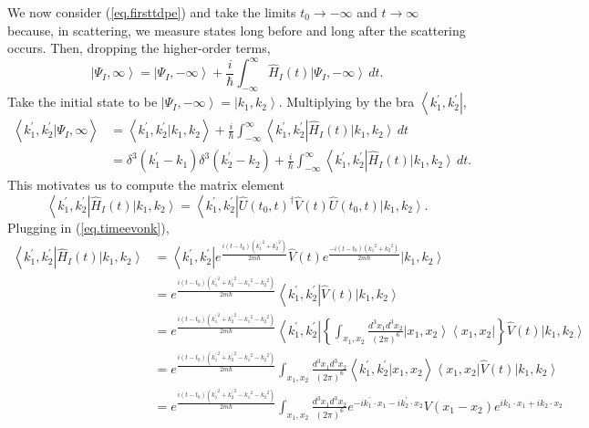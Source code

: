 \documentclass[11pt]{article}
\newcommand{\bra}[1]{\left\langle#1\right|}
\newcommand{\ket}[1]{\left|#1\right\rangle}
\newcommand{\braket}[2]{\left\langle#1|#2\right\rangle}
\newcommand{\op}[1]{\hat{#1}}
\theoremstyle{theorem}
\theoremstyle{remark}
\theoremstyle{step}
\theoremstyle{gap}
\begin{document}
We now consider (\ref{eq.firsttdpe}) and take the limits \(t_0 \to -\infty\) and \(t \to \infty\) because, in scattering, we measure states long before and long after the scattering occurs. Then, dropping the higher-order terms,
\[
\ket{\Psi_I, \infty} = \ket{\Psi_I, -\infty} + \frac{i}{\hbar} \int_{-\infty}^\infty \op{H}_I(t)\ket{\Psi_I, -\infty} \,dt.
\]
Take the initial state to be \(\ket{\Psi_I, -\infty} = \ket{k_1, k_2}\). Multiplying by the bra \(\bra{k_1^\prime, k_2^\prime}\),
\begin{align}
\braket{k_1^\prime, k_2^\prime}{\Psi_I, \infty} &= \braket{k_1^\prime, k_2^\prime}{k_1, k_2} + \frac{i}{\hbar} \int_{-\infty}^\infty \bra{k_1^\prime, k_2^\prime} \op{H}_I(t)\ket{k_1, k_2} \,dt \nonumber\\
&= \delta^3(k_1^\prime - k_1)\delta^3(k_2^\prime - k_2) + \frac{i}{\hbar} \int_{-\infty}^\infty \bra{k_1^\prime, k_2^\prime} \op{H}_I(t)\ket{k_1, k_2} \,dt. \label{eq.intermed}
\end{align}
This motivates us to compute the matrix element
\[
\bra{k_1^\prime, k_2^\prime} \op{H}_I(t)\ket{k_1, k_2} = \bra{k_1^\prime, k_2^\prime} \op{U}(t_0, t)^\dagger \op{V}(t) \op{U}(t_0, t) \ket{k_1, k_2}.
\]
Plugging in (\ref{eq.timeevonk}),
\begin{align*}
\bra{k_1^\prime, k_2^\prime} \op{H}_I(t)\ket{k_1, k_2} &= \bra{k_1^\prime, k_2^\prime} e^{\frac{i\left(t-t_0\right)\left({k_1^\prime}^2 + {k_2^\prime}^2\right)}{2m\hbar}} \op{V}(t) e^{\frac{-i\left(t-t_0\right)\left({k_1}^2 + {k_2}^2\right)}{2m\hbar}} \ket{k_1, k_2} \\
&= e^{\frac{i\left(t-t_0\right)\left({k_1^\prime}^2 + {k_2^\prime}^2 - {k_1}^2 - {k_2}^2\right)}{2m\hbar}} \bra{k_1^\prime, k_2^\prime} \op{V}(t) \ket{k_1, k_2} \\
&= e^{\frac{i\left(t-t_0\right)\left({k_1^\prime}^2 + {k_2^\prime}^2 - {k_1}^2 - {k_2}^2\right)}{2m\hbar}} \bra{k_1^\prime, k_2^\prime} \left\{\int_{x_1, x_2} \frac{d^3 x_1 d^3 x_2}{(2\pi)^6}\ket{x_1, x_2}\bra{x_1, x_2}\right\}\op{V}(t) \ket{k_1, k_2} \\
&= e^{\frac{i\left(t-t_0\right)\left({k_1^\prime}^2 + {k_2^\prime}^2 - {k_1}^2 - {k_2}^2\right)}{2m\hbar}}  \int_{x_1, x_2} \frac{d^3 x_1 d^3 x_2}{(2\pi)^6}\braket{k_1^\prime, k_2^\prime}{x_1, x_2}\bra{x_1, x_2}\op{V}(t) \ket{k_1, k_2} \\
&= e^{\frac{i\left(t-t_0\right)\left({k_1^\prime}^2 + {k_2^\prime}^2 - {k_1}^2 - {k_2}^2\right)}{2m\hbar}}  \int_{x_1, x_2} \frac{d^3 x_1 d^3 x_2}{(2\pi)^6}e^{-ik_1^\prime\cdot x_1 - ik_2^\prime\cdot x_2}V(x_1 - x_2) e^{ik_1\cdot x_1 + ik_2\cdot x_2} 
\end{align*}
\end{document}
